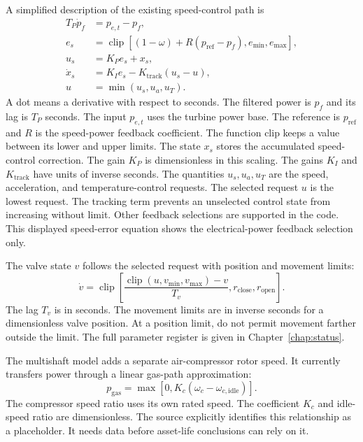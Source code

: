 \documentclass[11pt,a4paper]{report}
\begin{document}
A simplified description of the existing speed-control path is
\begin{align}
T_P\dot p_f&=p_{e,t}-p_f,\\
e_s&=\operatorname{clip}\left[(1-\omega)+R(p_{\mathrm{ref}}-p_f),e_{\min},e_{\max}\right],\\
u_s&=K_Pe_s+x_s,\\
\dot x_s&=K_Ie_s-K_{\mathrm{track}}(u_s-u),\\
u&=\min(u_s,u_a,u_T).
\end{align}
A dot means a derivative with respect to seconds.
The filtered power is $p_f$ and its lag is $T_P$ seconds.
The input $p_{e,t}$ uses the turbine power base.
The reference is $p_{\mathrm{ref}}$ and $R$ is the speed-power feedback coefficient.
The function clip keeps a value between its lower and upper limits.
The state $x_s$ stores the accumulated speed-control correction.
The gain $K_P$ is dimensionless in this scaling.
The gains $K_I$ and $K_{\mathrm{track}}$ have units of inverse seconds.
The quantities $u_s,u_a,u_T$ are the speed, acceleration, and temperature-control requests.
The selected request $u$ is the lowest request.
The tracking term prevents an unselected control state from increasing without limit.
Other feedback selections are supported in the code.
This displayed speed-error equation shows the electrical-power feedback selection only.

The valve state $v$ follows the selected request with position and movement limits:
\begin{equation}
\dot v=\operatorname{clip}\left[
\frac{\operatorname{clip}(u,v_{\min},v_{\max})-v}{T_v},
r_{\mathrm{close}},r_{\mathrm{open}}\right].
\end{equation}
The lag $T_v$ is in seconds.
The movement limits are in inverse seconds for a dimensionless valve position.
At a position limit, do not permit movement farther outside the limit.
The full parameter register is given in Chapter~\ref{chap:status}.

The multishaft model adds a separate air-compressor rotor speed.
It currently transfers power through a linear gas-path approximation:
\begin{equation}
p_{\mathrm{gas}}=\max[0,K_c(\omega_c-\omega_{c,\mathrm{idle}})].
\end{equation}
The compressor speed ratio uses its own rated speed.
The coefficient $K_c$ and idle-speed ratio are dimensionless.
The source explicitly identifies this relationship as a placeholder.
It needs data before asset-life conclusions can rely on it.
\end{document}
